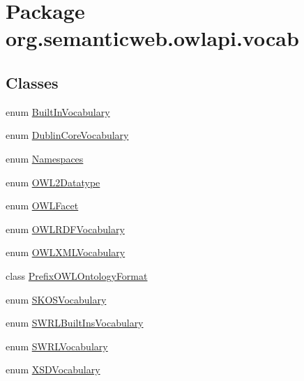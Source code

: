 \hypertarget{namespaceorg_1_1semanticweb_1_1owlapi_1_1vocab}{\section{Package org.\-semanticweb.\-owlapi.\-vocab}
\label{namespaceorg_1_1semanticweb_1_1owlapi_1_1vocab}
}
\subsection*{Classes}
\begin{DoxyCompactItemize}
\item 
enum \hyperlink{enumorg_1_1semanticweb_1_1owlapi_1_1vocab_1_1_built_in_vocabulary}{Built\-In\-Vocabulary}
\item 
enum \hyperlink{enumorg_1_1semanticweb_1_1owlapi_1_1vocab_1_1_dublin_core_vocabulary}{Dublin\-Core\-Vocabulary}
\item 
enum \hyperlink{enumorg_1_1semanticweb_1_1owlapi_1_1vocab_1_1_namespaces}{Namespaces}
\item 
enum \hyperlink{enumorg_1_1semanticweb_1_1owlapi_1_1vocab_1_1_o_w_l2_datatype}{O\-W\-L2\-Datatype}
\item 
enum \hyperlink{enumorg_1_1semanticweb_1_1owlapi_1_1vocab_1_1_o_w_l_facet}{O\-W\-L\-Facet}
\item 
enum \hyperlink{enumorg_1_1semanticweb_1_1owlapi_1_1vocab_1_1_o_w_l_r_d_f_vocabulary}{O\-W\-L\-R\-D\-F\-Vocabulary}
\item 
enum \hyperlink{enumorg_1_1semanticweb_1_1owlapi_1_1vocab_1_1_o_w_l_x_m_l_vocabulary}{O\-W\-L\-X\-M\-L\-Vocabulary}
\item 
class \hyperlink{classorg_1_1semanticweb_1_1owlapi_1_1vocab_1_1_prefix_o_w_l_ontology_format}{Prefix\-O\-W\-L\-Ontology\-Format}
\item 
enum \hyperlink{enumorg_1_1semanticweb_1_1owlapi_1_1vocab_1_1_s_k_o_s_vocabulary}{S\-K\-O\-S\-Vocabulary}
\item 
enum \hyperlink{enumorg_1_1semanticweb_1_1owlapi_1_1vocab_1_1_s_w_r_l_built_ins_vocabulary}{S\-W\-R\-L\-Built\-Ins\-Vocabulary}
\item 
enum \hyperlink{enumorg_1_1semanticweb_1_1owlapi_1_1vocab_1_1_s_w_r_l_vocabulary}{S\-W\-R\-L\-Vocabulary}
\item 
enum \hyperlink{enumorg_1_1semanticweb_1_1owlapi_1_1vocab_1_1_x_s_d_vocabulary}{X\-S\-D\-Vocabulary}
\end{DoxyCompactItemize}
